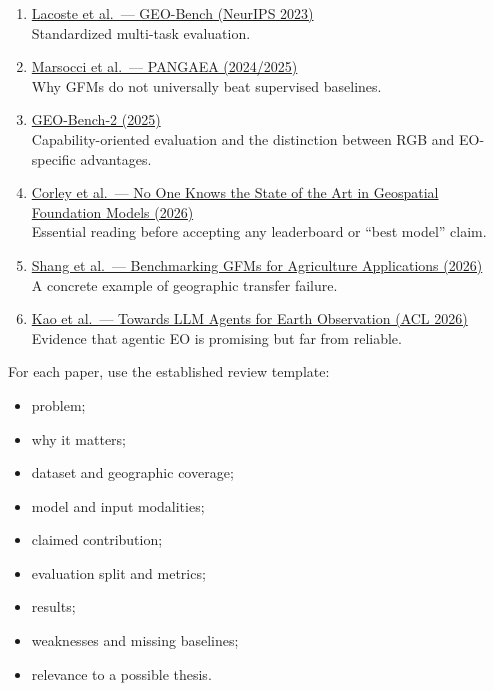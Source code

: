 \documentclass[
  a4paper,
  11pt]{article}
\providecommand{\tightlist}{%
  \setlength{\itemsep}{0pt}\setlength{\parskip}{0pt}}
\begin{document}
\begin{enumerate}
\def\labelenumi{\arabic{enumi}.}
\setcounter{enumi}{9}
\item
  \href{https://proceedings.neurips.cc/paper_files/paper/2023/hash/a0644215d9cff6646fa334dfa5d29c5a-Abstract-Datasets_and_Benchmarks.html}{Lacoste
  et al.~--- GEO-Bench (NeurIPS 2023)}\\
  Standardized multi-task evaluation.
\item
  \href{https://arxiv.org/abs/2412.04204}{Marsocci et al.~--- PANGAEA
  (2024/2025)}\\
  Why GFMs do not universally beat supervised baselines.
\item
  \href{https://arxiv.org/html/2511.15658v1}{GEO-Bench-2 (2025)}\\
  Capability-oriented evaluation and the distinction between RGB and
  EO-specific advantages.
\item
  \href{https://arxiv.org/html/2605.12678v1}{Corley et al.~--- No One
  Knows the State of the Art in Geospatial Foundation Models (2026)}\\
  Essential reading before accepting any leaderboard or ``best model''
  claim.
\item
  \href{https://arxiv.org/abs/2606.29664}{Shang et al.~--- Benchmarking
  GFMs for Agriculture Applications (2026)}\\
  A concrete example of geographic transfer failure.
\item
  \href{https://aclanthology.org/2026.findings-acl.124.pdf}{Kao et
  al.~--- Towards LLM Agents for Earth Observation (ACL 2026)}\\
  Evidence that agentic EO is promising but far from reliable.
\end{enumerate}

For each paper, use the established review template:

\begin{itemize}
\tightlist
\item
  problem;
\item
  why it matters;
\item
  dataset and geographic coverage;
\item
  model and input modalities;
\item
  claimed contribution;
\item
  evaluation split and metrics;
\item
  results;
\item
  weaknesses and missing baselines;
\item
  relevance to a possible thesis.
\end{itemize}
\end{document}
